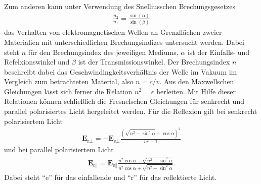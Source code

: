 \noindent
Zum anderen kann unter Verwendung des Snelliusschen Brechungsgesetzes
\begin{align}
    \frac{n_2}{n_1} = \frac{\sin(\alpha)}{\sin(\beta)}
    \label{eq:snellius}
\end{align}
das Verhalten von elektromagnetischen Wellen an Grenzflächen zweier Materialien mit unterschiedlichen Brechungsindizes untersucht werden.
Dabei steht $n$ für den Brechungsindex des jeweiligen Mediums, $\alpha$ ist der Einfalls- und Refelxionswinkel und $\beta$ ist der Transmissionswinkel.
Der Brechungsindex $n$ beschreibt dabei das Geschwindingkeitsverhältnis der Welle im Vakuum im Vergleich zum betrachteten Material, also $n = c/v$.
Aus den Maxwellschen Gleichungen lässt sich ferner die Relation $n^2 = \epsilon$ herleiten.
Mit Hilfe dieser Relationen können schließlich die Fresnelschen Gleichungen für senkrecht und parallel polarisiertes Licht hergeleitet werden.
Für die Reflexion gilt bei senkrecht polarisiertem Licht
\begin{align}
    \symbf{E}_{\text{r}\perp} = - \symbf{E}_{\text{e}\perp} \frac{\left(\sqrt{n^2 -\sin^2\alpha} - \cos{\alpha}\right)^2}{n^2 - 1}
    \label{eq:senkrecht}
\end{align}
und bei parallel polarisiertem Licht
\begin{align}
    \symbf{E}_{\text{r}\parallel} = \symbf{E}_{\text{e}\parallel} \frac{n^2 \cos\alpha - \sqrt{n^2 - \sin^2\alpha}}{n^2 \cos\alpha + \sqrt{n^2 - \sin^2\alpha}}.
    \label{eq:parallel}
\end{align}
Dabei steht \enquote{e} für das einfallende und \enquote{r} für das reflektierte Licht.

